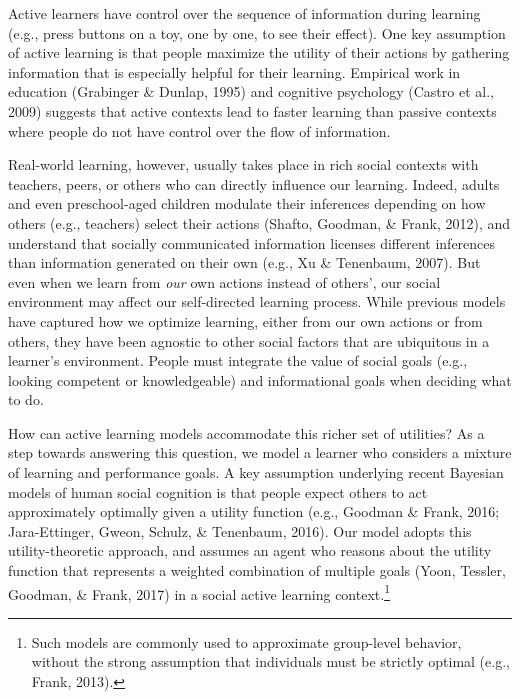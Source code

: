 \documentclass[10pt, letterpaper]{article}
\begin{document}
Active learners have control over the sequence of information during
learning (e.g., press buttons on a toy, one by one, to see their
effect). One key assumption of active learning is that people maximize
the utility of their actions by gathering information that is especially
helpful for their learning. Empirical work in education (Grabinger \&
Dunlap, 1995) and cognitive psychology (Castro et al., 2009) suggests
that active contexts lead to faster learning than passive contexts where
people do not have control over the flow of information.

Real-world learning, however, usually takes place in rich social
contexts with teachers, peers, or others who can directly influence our
learning. Indeed, adults and even preschool-aged children modulate their
inferences depending on how others (e.g., teachers) select their actions
(Shafto, Goodman, \& Frank, 2012), and understand that socially
communicated information licenses different inferences than information
generated on their own (e.g., Xu \& Tenenbaum, 2007). But even when we
learn from \emph{our} own actions instead of others', our social
environment may affect our self-directed learning process. While
previous models have captured how we optimize learning, either from our
own actions or from others, they have been agnostic to other social
factors that are ubiquitous in a learner's environment. People must
integrate the value of social goals (e.g., looking competent or
knowledgeable) and informational goals when deciding what to do.

How can active learning models accommodate this richer set of utilities?
As a step towards answering this question, we model a learner who
considers a mixture of learning and performance goals. A key assumption
underlying recent Bayesian models of human social cognition is that
people expect others to act approximately optimally given a utility
function (e.g., Goodman \& Frank, 2016; Jara-Ettinger, Gweon, Schulz, \&
Tenenbaum, 2016). Our model adopts this utility-theoretic approach, and
assumes an agent who reasons about the utility function that represents
a weighted combination of multiple goals (Yoon, Tessler, Goodman, \&
Frank, 2017) in a social active learning context.\footnote{Such models
  are commonly used to approximate group-level behavior, without the
  strong assumption that individuals must be strictly optimal (e.g.,
  Frank, 2013).}
\end{document}

